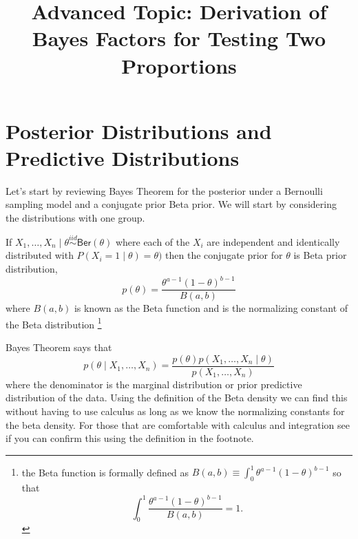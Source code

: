 \documentclass[11pt]{article}
\title{Advanced Topic:  Derivation of Bayes Factors for Testing Two Proportions}
\def\Ber{\textsf{Ber}}
\def\iid{\stackrel{iid}{\sim}}
\begin{document}


\maketitle 

\section*{Posterior Distributions and Predictive Distributions}
Let's start by reviewing Bayes Theorem for the posterior under a Bernoulli sampling model and a conjugate prior Beta prior. 
We will start by considering the distributions with one group.


If $X_{1}, \ldots, X_{n} \mid \theta \iid \Ber(\theta)$ 
where each of the $X_i$ are independent and identically distributed with $P(X_i = 1 \mid \theta) = \theta)$ then the conjugate prior for $\theta$ is Beta prior distribution,  
$$p(\theta) = \frac{\theta^{a-1} (1 - \theta)^{b-1}}{B(a,b)}$$
where $B(a,b)$ is known as the Beta function and is the normalizing constant of the
Beta distribution \footnote{the Beta function is formally defined as   
$B(a,b) \equiv \int_0^1 \theta^{a - 1} (1 - \theta)^{b-1}$ so that 
$$\int_0^1 \frac{\theta^{a - 1} (1 - \theta)^{b-1}}{B(a,b)} = 1.$$}
 

Bayes Theorem says that
$$p(\theta \mid X_1, \ldots, X_{n})  =  \frac{p(\theta) p(X_{1}, \ldots, X_{n} \mid \theta)}{p(X_1, \ldots, X_{n})}$$ 
where the denominator is the marginal distribution or prior predictive distribution of the data.  Using the definition of the Beta density we can find this without having to use calculus as long as we know the normalizing constants for the beta density.   For those that are comfortable with calculus and integration see if you can confirm this using the definition in the footnote.
\end{document}
